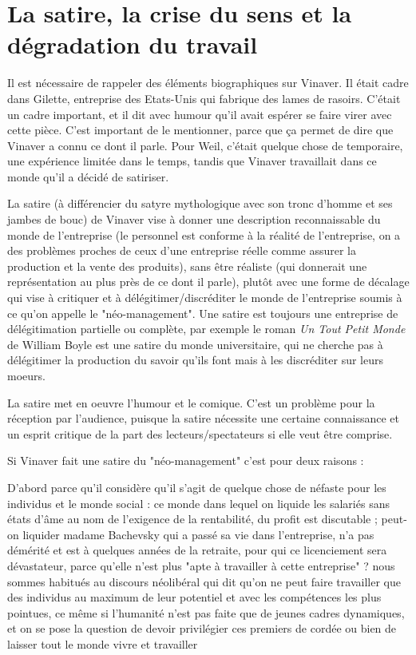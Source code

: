 \documentclass[a4paper,12pt]{book}
\begin{document}
\chapter{La satire, la crise du sens et la dégradation du travail}
Il est nécessaire de rappeler des éléments biographiques sur Vinaver. Il était cadre dans Gilette, entreprise des Etats-Unis qui fabrique des lames de rasoirs. C'était un cadre important, et il dit avec humour qu'il avait espérer se faire virer avec cette pièce. C'est important de le mentionner, parce que ça permet de dire que Vinaver a connu ce dont il parle. Pour Weil, c'était quelque chose de temporaire, une expérience limitée dans le temps, tandis que Vinaver travaillait dans ce monde qu'il a décidé de satiriser.
\par La satire (à différencier du satyre mythologique avec son tronc d'homme et ses jambes de bouc) de Vinaver vise à donner une description reconnaissable du monde de l'entreprise (le personnel est conforme à la réalité de l'entreprise, on a des problèmes proches de ceux d'une entreprise réelle comme assurer la production et la vente des produits), sans être réaliste (qui donnerait une représentation au plus près de ce dont il parle), plutôt avec une forme de décalage qui vise à critiquer et à délégitimer/discréditer le monde de l'entreprise soumis à ce qu'on appelle le "néo-management". Une satire est toujours une entreprise de délégitimation partielle ou complète, par exemple le roman \textit{Un Tout Petit Monde} de William Boyle est une satire du monde universitaire, qui ne cherche pas à délégitimer la production du savoir qu'ils font mais à les discréditer sur leurs moeurs.
\par La satire met en oeuvre l'humour et le comique. C'est un problème pour la réception par l'audience, puisque la satire nécessite une certaine connaissance et un esprit critique de la part des lecteurs/spectateurs si elle veut être comprise.
\par Si Vinaver fait une satire du "néo-management" c'est pour deux raisons :
\par D'abord parce qu'il considère qu'il s'agit de quelque chose de néfaste pour les individus et le monde social : ce monde dans lequel on liquide les salariés sans états d'âme au nom de l'exigence de la rentabilité, du profit est discutable ; peut-on liquider madame Bachevsky qui a passé sa vie dans l'entreprise, n'a pas démérité et est à quelques années de la retraite, pour qui ce licenciement sera dévastateur, parce qu'elle n'est plus "apte à travailler à cette entreprise" ? nous sommes habitués au discours néolibéral qui dit qu'on ne peut faire travailler que des individus au maximum de leur potentiel et avec les compétences les plus pointues, ce même si l'humanité n'est pas faite que de jeunes cadres dynamiques, et on se pose la question de devoir privilégier ces premiers de cordée ou bien de laisser tout le monde vivre et travailler
\end{document}

